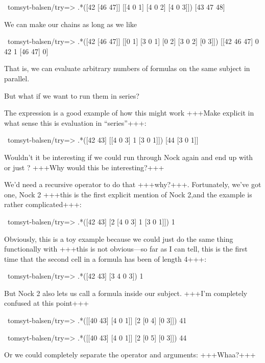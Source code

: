 \begin{code}
~tomsyt-balsen/try=> .*([42 [46 47]] [[4 0 1] [4 0 2] [4 0 3]])
[43 47 48]
\end{code}
We can make our chains as long as we like

\begin{code}
~tomsyt-balsen/try=> .*([42 [46 47]] [[0 1] [3 0 1] [0 2] [3 0 2] [0 3]])
[[42 46 47] 0 42 1 [46 47] 0]
\end{code}

That is, we can evaluate arbitrary numbers of formulas on the same subject in
parallel.

But what if we want to run them in series?

The expression \kode{*[[42 43] [[4 0 3] 1 [0 1]]]} is a good example of how this might work +++Make explicit in what sense this is evaluation in ``series''+++:

\begin{code}
~tomsyt-balsen/try=> .*([42 43] [[4 0 3] 1 [3 0 1]])
[44 [3 0 1]]
\end{code}

Wouldn't it be interesting if we could run \kode{[44 [3 0 1]]} through Nock again and end up with \kode{*[44 [3 0 1]]} or just ? +++Why would this be interesting?+++

We'd need a recursive operator to do that +++why?+++. Fortunately, we've got one, Nock 2 +++this is the first explicit mention of Nock 2,and the example is rather complicated+++:

\begin{code}
~tomsyt-balsen/try=> .*([42 43] [2 [4 0 3] 1 [3 0 1]])
1
\end{code}
Obviously, this is a toy example because we could just do the same thing
functionally with +++this is not obvious—so far as I can tell, this is the first time that the second cell in a formula has been of length 4+++:

\begin{code}
~tomsyt-balsen/try=> .*([42 43] [3 4 0 3])
1
\end{code}
But Nock 2 also lets us call a formula inside our subject. +++I'm completely confused at this point+++

\begin{code}
~tomsyt-balsen/try=> .*([[40 43] [4 0 1]] [2 [0 4] [0 3]])
41

~tomsyt-balsen/try=> .*([[40 43] [4 0 1]] [2 [0 5] [0 3]])
44
\end{code}
Or we could completely separate the operator and arguments: +++Whaa?+++

